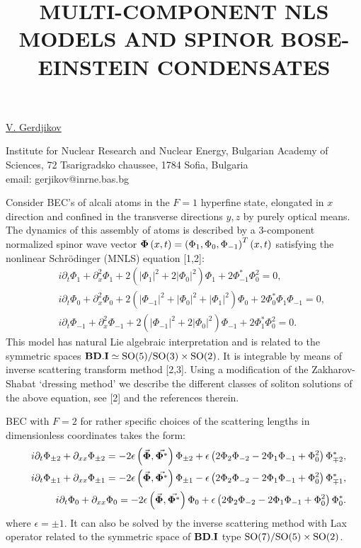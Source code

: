 \title{MULTI-COMPONENT NLS MODELS AND SPINOR BOSE-EINSTEIN CONDENSATES}

\underline{V. Gerdjikov}


Institute for Nuclear Research and Nuclear Energy,
Bulgarian Academy of Sciences,
72 Tsarigradsko chaussee,
1784 Sofia, Bulgaria\\
email: gerjikov@inrne.bas.bg

Consider BEC's of alcali atoms in the $F=1$ hyperfine state,
elongated in $x$ direction and confined in the transverse
directions $y,z$ by purely optical means. The dynamics of this assembly of
atoms is described by a  3-component
normalized spinor wave vector  ${\bf\Phi}\left(x,t\right)=\left(\Phi_1,\Phi_0 ,\Phi_{-1}\right)^{T}\left(x,t\right)$ satisfying the
nonlinear Schr\"{o}dinger (MNLS) equation [1,2]:
\begin{eqnarray}
&& i\partial_{t}\Phi_{1}+\partial^{2}_{x}\Phi_{1}+2\left(|\Phi_{1}|^2
+2|\Phi_{0}|^2\right)\Phi_{1} +2\Phi_{-1}^{*}\Phi_{0}^2=0, \nonumber\\
&& i\partial_{t}\Phi_{0}+\partial^{2}_{x}
\Phi_{0}+2\left(|\Phi_{-1}|^2
+|\Phi_{0}|^2+|\Phi_{1}|^2\right)\Phi_{0} +2\Phi_{0}^{*}\Phi_{1}\Phi_{-1}=0,\\
&& i\partial_{t}\Phi_{-1}+\partial^{2}_{x}
\Phi_{-1}+2\left(|\Phi_{-1}|^2+ 2|\Phi_{0}|^2\right)\Phi_{-1}
+2\Phi_{1}^{*}\Phi_{0}^2=0. \nonumber
\end{eqnarray}
This  model has natural Lie algebraic interpretation and is
related to the symmetric spaces ${\bf BD.I}\simeq {\rm SO(5)}/{\rm
SO(3)\times SO(2)}$. It is integrable by means of inverse scattering transform
method [2,3]. Using a modification of the Zakharov-Shabat
`dressing method' we describe the different classes of soliton solutions of
the above equation, see [2] and the references therein.

BEC with $F=2$ for rather specific choices of the scattering lengths in dimensionless
coordinates takes the form:
\begin{eqnarray}
&&i\partial_t\Phi_{\pm 2}+\partial_{xx}\Phi_{\pm 2}= -2\epsilon
\left(\vec{{\bf \Phi}},\vec{{\bf \Phi^{*}}}\right) \Phi_{\pm 2} +\epsilon
\left(2\Phi_{2}\Phi_{-2}-2 \Phi_{1}\Phi_{-1}+\Phi_{0}^2\right) \Phi_{\mp
2}^*,\nonumber
\\
&&i\partial_t\Phi_{\pm 1}+\partial_{xx}\Phi_{\pm 1}= -2\epsilon
\left(\vec{{\bf \Phi}},\vec{{\bf \Phi^{*}}}\right) \Phi_{\pm 1} -\epsilon
\left(2\Phi_{2}\Phi_{-2}-2 \Phi_{1}\Phi_{-1}+\Phi_{0}^2\right) \Phi_{\mp
1}^*,\nonumber
\\
&&i\partial_t\Phi_{0}+\partial_{xx}\Phi_{0}=  -2\epsilon
\left(\vec{{\bf \Phi}},\vec{{\bf \Phi^{*}}}\right) \Phi_{0} +\epsilon
\left(2\Phi_{2}\Phi_{-2}-2 \Phi_{1}\Phi_{-1}+\Phi_{0}^2\right)
\Phi_{0}^*.\nonumber
\end{eqnarray}
where $\epsilon =\pm 1$. It can also be solved by the inverse scattering method
with Lax operator related to the symmetric space of ${\bf BD.I}$ type $ {\rm SO(7)}/{\rm
SO(5)\times SO(2)}$.

